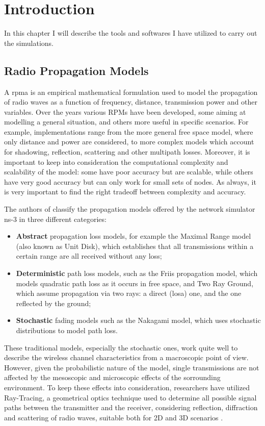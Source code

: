 
\chapter{Introduction}
	In this chapter I will describe the tools and softwares I have utilized to carry out the simulations.
	
	\section{Radio Propagation Models}
		A \gls{rpma} is an empirical mathematical formulation used to model the propagation of radio waves as a function of frequency, distance, transmission power and other variables. Over the years various RPMs have been developed, some aiming at modelling a general situation, and others more useful in specific scenarios. For example, implementations range from the more general free space model, where only distance and power are considered, to more complex models which account for shadowing, reflection, scattering and other multipath losses. Moreover, it is important to keep into consideration the computational complexity and scalability of the model: some have poor accuracy but are scalable, while others have very good accuracy but can only work for small sets of nodes. As always, it is very important to find the right tradeoff between complexity and accuracy.
		
		
		The authors of \cite{6298165} classify the propagation models offered by the network simulator ns-3 in three different categories:
		\begin{itemize}
			\item \textbf{Abstract} propagation loss models, for example the Maximal Range model (also known as Unit Disk), which establishes that all transmissions within a certain range are all received without any loss;
			\item \textbf{Deterministic} path loss models, such as the Friis propagation model, which models quadratic path loss as it occurs in free space, and Two Ray Ground, which assume propagation via two rays: a direct (\acrshort{losa}) one, and the one reflected by the ground;
			\item \textbf{Stochastic} fading models such as the Nakagami model, which uses stochastic distributions to model path loss.
		\end{itemize}
	
	
		These traditional models, especially the stochastic ones, work quite well to describe the wireless channel characteristics from a macroscopic point of view. However, given the probabilistic nature of the model, single transmissions are not affected by the mesoscopic and microscopic effects of the sorrounding environment. To keep these effects into consideration, researchers have utilized Ray-Tracing, a geometrical optics technique used to determine all possible signal paths between the transmitter and the receiver, considering reflection, diffraction and scattering of radio waves, suitable both for 2D and 3D scenarios \cite{245274} \cite{765022}.
		
